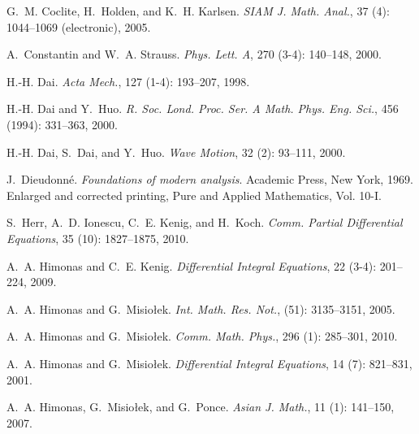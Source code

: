 \documentclass[final]{thesis}
\begin{document}
\begin{thebibliography}{35}
G.~M. Coclite, H.~Holden, and K.~H. Karlsen.
\newblock \emph{SIAM J. Math. Anal.}, 37 (4): 1044--1069
  (electronic), 2005.

A.~Constantin and W.~A. Strauss.
\newblock \emph{Phys. Lett. A}, 270 (3-4): 140--148, 2000.

H.-H. Dai.
\newblock \emph{Acta Mech.}, 127 (1-4): 193--207, 1998.

H.-H. Dai and Y.~Huo.
\newblock \emph{R. Soc. Lond. Proc. Ser. A Math. Phys. Eng. Sci.}, 456
  (1994): 331--363, 2000.

H.-H. Dai, S.~Dai, and Y.~Huo.
\newblock \emph{Wave Motion}, 32 (2): 93--111, 2000.

J.~Dieudonn{{\'e}}.
\newblock \emph{Foundations of modern analysis}.
\newblock Academic Press, New York, 1969.
\newblock Enlarged and corrected printing, Pure and Applied Mathematics, Vol.
  10-I.

S.~Herr, A.~D. Ionescu, C.~E. Kenig, and H.~Koch.
\newblock \emph{Comm. Partial Differential Equations}, 35
  (10): 1827--1875, 2010.

A.~A. Himonas and C.~E. Kenig.
\newblock \emph{Differential Integral Equations}, 22 (3-4):
  201--224, 2009.

A.~A. Himonas and G.~Misio{\l}ek.
\newblock \emph{Int. Math. Res. Not.},  (51): 3135--3151,
  2005.

A.~A. Himonas and G.~Misio{\l}ek.
\newblock \emph{Comm. Math. Phys.}, 296 (1): 285--301, 2010.

A.~A. Himonas and G.~Misio{\l}ek.
\newblock \emph{Differential Integral Equations}, 14 (7):
  821--831, 2001.

A.~A. Himonas, G.~Misio{\l}ek, and G.~Ponce.
\newblock \emph{Asian J. Math.}, 11 (1): 141--150, 2007.


\end{thebibliography}
\end{document}

